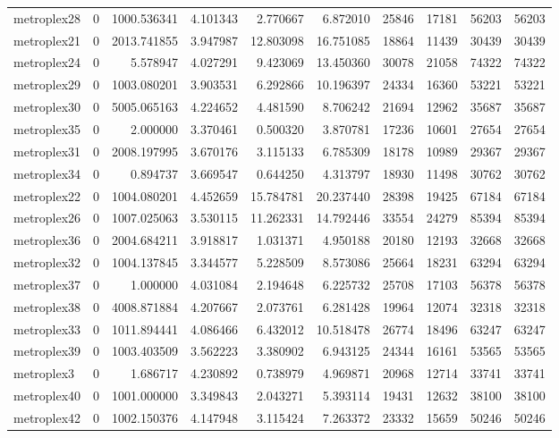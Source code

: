 \begin{longtable}{|l|r|r|r|r|r|r|r|r|r|}
metroplex28 & 0 & 1000.536341 & 4.101343 & 2.770667 & 6.872010 & 25846 & 17181 & 56203 & 56203 \\
metroplex21 & 0 & 2013.741855 & 3.947987 & 12.803098 & 16.751085 & 18864 & 11439 & 30439 & 30439 \\
metroplex24 & 0 & 5.578947 & 4.027291 & 9.423069 & 13.450360 & 30078 & 21058 & 74322 & 74322 \\
metroplex29 & 0 & 1003.080201 & 3.903531 & 6.292866 & 10.196397 & 24334 & 16360 & 53221 & 53221 \\
metroplex30 & 0 & 5005.065163 & 4.224652 & 4.481590 & 8.706242 & 21694 & 12962 & 35687 & 35687 \\
metroplex35 & 0 & 2.000000 & 3.370461 & 0.500320 & 3.870781 & 17236 & 10601 & 27654 & 27654 \\
metroplex31 & 0 & 2008.197995 & 3.670176 & 3.115133 & 6.785309 & 18178 & 10989 & 29367 & 29367 \\
metroplex34 & 0 & 0.894737 & 3.669547 & 0.644250 & 4.313797 & 18930 & 11498 & 30762 & 30762 \\
metroplex22 & 0 & 1004.080201 & 4.452659 & 15.784781 & 20.237440 & 28398 & 19425 & 67184 & 67184 \\
metroplex26 & 0 & 1007.025063 & 3.530115 & 11.262331 & 14.792446 & 33554 & 24279 & 85394 & 85394 \\
metroplex36 & 0 & 2004.684211 & 3.918817 & 1.031371 & 4.950188 & 20180 & 12193 & 32668 & 32668 \\
metroplex32 & 0 & 1004.137845 & 3.344577 & 5.228509 & 8.573086 & 25664 & 18231 & 63294 & 63294 \\
metroplex37 & 0 & 1.000000 & 4.031084 & 2.194648 & 6.225732 & 25708 & 17103 & 56378 & 56378 \\
metroplex38 & 0 & 4008.871884 & 4.207667 & 2.073761 & 6.281428 & 19964 & 12074 & 32318 & 32318 \\
metroplex33 & 0 & 1011.894441 & 4.086466 & 6.432012 & 10.518478 & 26774 & 18496 & 63247 & 63247 \\
metroplex39 & 0 & 1003.403509 & 3.562223 & 3.380902 & 6.943125 & 24344 & 16161 & 53565 & 53565 \\
metroplex3 & 0 & 1.686717 & 4.230892 & 0.738979 & 4.969871 & 20968 & 12714 & 33741 & 33741 \\
metroplex40 & 0 & 1001.000000 & 3.349843 & 2.043271 & 5.393114 & 19431 & 12632 & 38100 & 38100 \\
metroplex42 & 0 & 1002.150376 & 4.147948 & 3.115424 & 7.263372 & 23332 & 15659 & 50246 & 50246 \\

\end{longtable}
